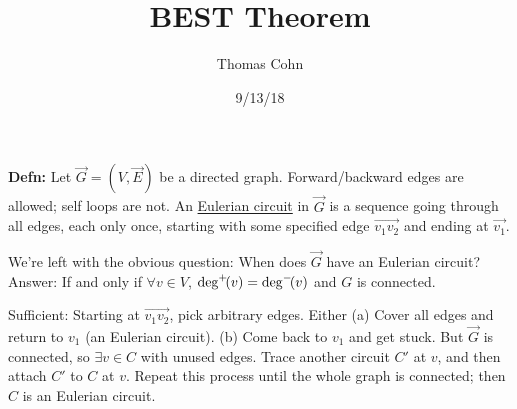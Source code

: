 \documentclass[10pt,letterpaper]{article}
\author{Thomas Cohn}
\title{BEST Theorem}
\date{9/13/18} %
\newcommand{\n}{\hfill\break}
\newcommand{\defn}[1]{\par\noindent\settowidth{\hangindent}{\textbf{Defn: }}\textbf{Defn: }#1\n}
\newcommand{\ptxt}[1]{\textrm{\textnormal{#1}}}
\newcommand{\degp}[1]{\ptxt{deg}^{+}\!\!\left(#1\right)}
\newcommand{\degn}[1]{\ptxt{deg}^{-}\!\!\left(#1\right)}
\begin{document}
\maketitle
\setlength\RaggedRightParindent{\parindent}
\RaggedRight

\defn{Let $\vec{G}=(V,\vec{E})$ be a directed graph. Forward/backward edges are allowed; self loops are not. An \underline{Eulerian circuit} in $\vec{G}$ is a sequence going through all edges, each only once, starting with some specified edge $\vec{v_{1}v_{2}}$ and ending at $\vec{v_{1}}$.}

\par\noindent We're left with the obvious question: When does $\vec{G}$ have an Eulerian circuit?\n
Answer: If and only if $\forall{}v\in{}V$, $\degp{v}=\degn{v}$ and $G$ is connected.\n

\par\noindent Sufficient: Starting at $\vec{v_{1}v_{2}}$, pick arbitrary edges. Either\n
(a) Cover all edges and return to $v_{1}$ (an Eulerian circuit).\n
(b) Come back to $v_{1}$ and get stuck. But $\vec{G}$ is connected, so $\exists{}v\in{}C$ with unused edges. Trace another\n
\phantom{(b) }circuit $C'$ at $v$, and then attach $C'$ to $C$ at $v$. Repeat this process until the whole graph is connected;\n
\phantom{(b) }then $C$ is an Eulerian circuit.\n
\end{document}
